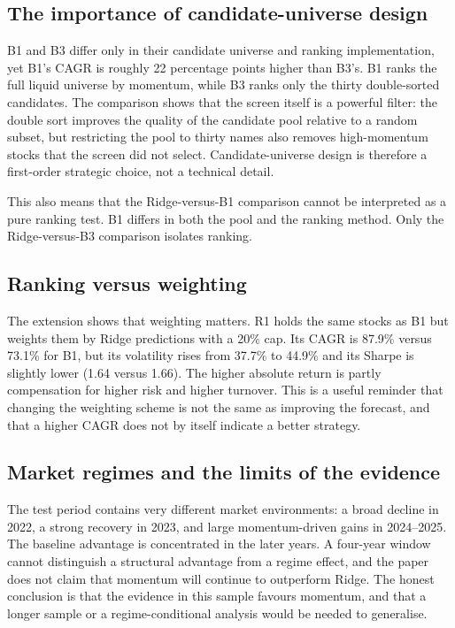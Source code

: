 \documentclass[11pt,a4paper]{article}
\begin{document}
\subsection{The importance of candidate-universe design}

B1 and B3 differ only in their candidate universe and ranking implementation, yet B1's CAGR is roughly 22 percentage points higher than B3's. B1 ranks the full liquid universe by momentum, while B3 ranks only the thirty double-sorted candidates. The comparison shows that the screen itself is a powerful filter: the double sort improves the quality of the candidate pool relative to a random subset, but restricting the pool to thirty names also removes high-momentum stocks that the screen did not select. Candidate-universe design is therefore a first-order strategic choice, not a technical detail.

This also means that the Ridge-versus-B1 comparison cannot be interpreted as a pure ranking test. B1 differs in both the pool and the ranking method. Only the Ridge-versus-B3 comparison isolates ranking.

\subsection{Ranking versus weighting}

The extension shows that weighting matters. R1 holds the same stocks as B1 but weights them by Ridge predictions with a 20\% cap. Its CAGR is 87.9\% versus 73.1\% for B1, but its volatility rises from 37.7\% to 44.9\% and its Sharpe is slightly lower (1.64 versus 1.66). The higher absolute return is partly compensation for higher risk and higher turnover. This is a useful reminder that changing the weighting scheme is not the same as improving the forecast, and that a higher CAGR does not by itself indicate a better strategy.

\subsection{Market regimes and the limits of the evidence}

The test period contains very different market environments: a broad decline in 2022, a strong recovery in 2023, and large momentum-driven gains in 2024--2025. The baseline advantage is concentrated in the later years. A four-year window cannot distinguish a structural advantage from a regime effect, and the paper does not claim that momentum will continue to outperform Ridge. The honest conclusion is that the evidence in this sample favours momentum, and that a longer sample or a regime-conditional analysis would be needed to generalise.
\end{document}
